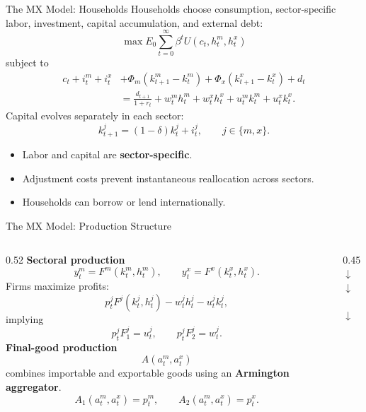 \documentclass[10pt]{beamer}
\begin{document}
\begin{frame}{The MX Model: Households}
\small
Households choose consumption, sector-specific labor, investment,
capital accumulation, and external debt:
\[
\max E_0 \sum_{t=0}^{\infty}
\beta^t U(c_t,h_t^m,h_t^x)
\]
subject to
\[
\begin{aligned}
c_t+i_t^m+i_t^x
&+\Phi_m(k_{t+1}^m-k_t^m)
+\Phi_x(k_{t+1}^x-k_t^x)+d_t \\
&=
\frac{d_{t+1}}{1+r_t}
+w_t^m h_t^m+w_t^x h_t^x
+u_t^m k_t^m+u_t^x k_t^x .
\end{aligned}
\]
Capital evolves separately in each sector:
\[
k_{t+1}^j=(1-\delta)k_t^j+i_t^j,
\qquad j\in\{m,x\}.
\]
\vspace{0.1cm}
\begin{itemize}
    \item Labor and capital are \textbf{sector-specific}.
    \item Adjustment costs prevent instantaneous reallocation across sectors.
    \item Households can borrow or lend internationally.
\end{itemize}
\end{frame}

\begin{frame}{The MX Model: Production Structure}
\small
\begin{columns}[T,onlytextwidth]
\begin{column}{0.52\textwidth}
\textbf{Sectoral production}
\[
y_t^m = F^m(k_t^m,h_t^m),
\qquad
y_t^x = F^x(k_t^x,h_t^x).
\]
Firms maximize profits:
\[
p_t^jF^j(k_t^j,h_t^j)
-w_t^jh_t^j-u_t^jk_t^j,
\]
implying
\[
p_t^jF_1^j=u_t^j,
\qquad
p_t^jF_2^j=w_t^j.
\]
\vspace{0.15cm}
\textbf{Final-good production}
\[
A(a_t^m,a_t^x)
\]
combines importable and exportable goods using an
\textbf{Armington aggregator}.
\[
A_1(a_t^m,a_t^x)=p_t^m,
\qquad
A_2(a_t^m,a_t^x)=p_t^x.
\]
\end{column}
\begin{column}{0.45\textwidth}
\centering
\vspace{0.6cm}
{\scriptsize
{}\quad{}\\[8pt]
$\downarrow$\hspace{1.5cm}$\downarrow$\\[8pt]
\\[8pt]
$\downarrow$\\[8pt]
}
\end{column}
\end{columns}
\end{frame}
\end{document}
